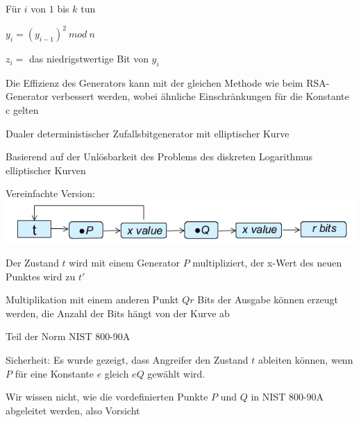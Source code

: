 \documentclass[a4paper]{article}
\begin{document}
\begin{multicols}{3}
\begin{itemize*}
\begin{enumerate*}
                  \item Für $i$ von $1$ bis $k$ tun
                  \begin{enumerate*}
                        \item $y_i = (y_{i-1})^2\ mod\ n$
                        \item $z_i =$ das niedrigstwertige Bit von $y_i$
                  \end{enumerate*}
            \end{enumerate*}
            \begin{itemize*}
                  \item Die Effizienz des Generators kann mit der gleichen Methode wie beim RSA-Generator verbessert werden, wobei ähnliche Einschränkungen für die Konstante c gelten
            \end{itemize*}
            \item Dualer deterministischer Zufallsbitgenerator mit elliptischer Kurve
            \begin{itemize*}
                  \item Basierend auf der Unlösbarkeit des Problems des diskreten Logarithmus elliptischer Kurven
                  \item Vereinfachte Version: \includegraphics[width=.6\linewidth]{Assets/NetworkSecurity-dual-elliptic-curve-deterministic-random-bit-generator.png}
                  \item Der Zustand $t$ wird mit einem Generator $P$ multipliziert, der x-Wert des neuen Punktes wird zu $t'$
                  \item Multiplikation mit einem anderen Punkt $Qr$ Bits der Ausgabe können erzeugt werden, die Anzahl der Bits hängt von der Kurve ab %
                  \item Teil der Norm NIST 800-90A
                  \item Sicherheit:  Es wurde gezeigt, dass Angreifer den Zustand $t$ ableiten können, wenn $P$ für eine Konstante $e$ gleich $eQ$ gewählt wird.
                  \item Wir wissen nicht, wie die vordefinierten Punkte $P$ und $Q$ in NIST 800-90A abgeleitet werden, also Vorsicht
            \end{itemize*}
      \end{itemize*}


\end{multicols}
\end{document}

